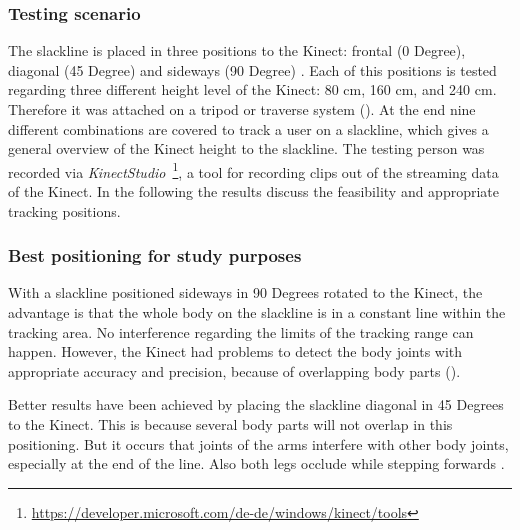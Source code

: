 \subsubsection{Testing scenario}

The slackline is placed in three positions to the Kinect: frontal (0 Degree), diagonal (45 Degree) and sideways (90 Degree) \textbf{}. Each of this positions is tested regarding three different height level of the Kinect: 80 cm, 160 cm, and 240 cm. Therefore it was attached on a tripod or traverse system (\textbf{}). At the end nine different combinations are covered to track a user on a slackline, which gives a general overview of the Kinect height to the slackline. The testing person was recorded via \textit{KinectStudio}~\footnote{\url{https://developer.microsoft.com/de-de/windows/kinect/tools}}, a tool for recording clips out of the streaming data of the Kinect. In the following the results discuss the feasibility and appropriate tracking positions.

\subsubsection{Best positioning for study purposes}
With a slackline positioned sideways in 90 Degrees rotated to the Kinect, the advantage is that the whole body on the slackline is in a constant line within the tracking area. No interference regarding the limits of the tracking range can happen. However, the Kinect had problems to detect the body joints with appropriate accuracy and precision, because of overlapping body parts (\textbf{}).

Better results have been achieved by placing the slackline diagonal in 45 Degrees to the Kinect. This is because several body parts will not overlap in this positioning.
But it occurs that joints of the arms interfere with other body joints, especially at the end of the line. Also both legs occlude while stepping forwards \textbf{}. 

